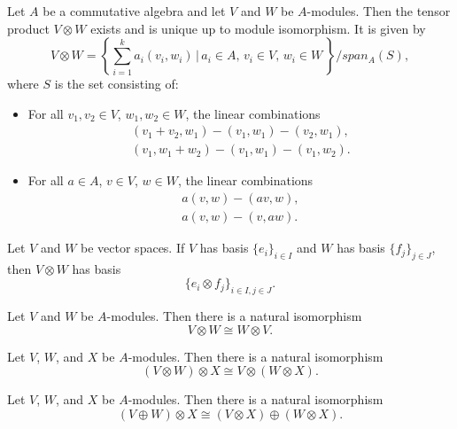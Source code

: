 \documentclass{ximera}
\begin{document}
\begin{theorem}
Let $A$ be a commutative algebra and let $V$ and $W$ be $A$-modules. Then the tensor product $V \otimes  W$ exists and is unique up to module isomorphism. It is given by 
\[   V \otimes  W =    \left\{ \sum_{i = 1}^k  a_i (v_i, w_i) \,\Big\vert \, a_i \in A, \, v_i \in V, \, w_i \in W \,  \right\} / span_A(S) ,    \]
where $S$ is the set consisting of:
\begin{itemize}
    \item  For all $v_1, v_2 \in V$, $w_1, w_2 \in W$, the linear combinations 
    \begin{gather*}
       (v_1 + v_2, w_1) - (v_1, w_1)- (v_2, w_1), \\
        (v_1, w_1 + w_2)  -  (v_1, w_1)  - (v_1, w_2) .
    \end{gather*}
    \item  For all $a \in A$, $v \in V$, $w \in W$, the linear combinations
    \begin{gather*}
       a (v,w) -  (av, w), \\
       a(v,w)- (v, aw).
    \end{gather*}
\end{itemize}
\end{theorem}



\begin{proposition}
Let $V$ and $W$ be vector spaces.  If $V$ has basis $\{ e_i \} _{i \in I}$ and $W$ has basis $\{ f_j \} _{j \in J}$, then $V \otimes W$ has basis 
\[   \{ e_i \otimes f_j \} _{i \in I , j \in J}  .   \]
\end{proposition}

\begin{proposition}[Commutativity] Let $V$ and  $W$  be $A$-modules. Then there is a natural isomorphism
\[  V \otimes  W  \cong W \otimes  V .  \]
\end{proposition}

\begin{proposition}[Associativity] Let $V$, $W$, and $X$ be $A$-modules. Then there is a natural isomorphism
\[ (V \otimes  W) \otimes  X \cong V \otimes  (W \otimes  X ) .  \]
\end{proposition}


\begin{proposition}[Distributivity] Let $V$, $W$, and $X$ be $A$-modules. Then there is a natural isomorphism
\[ (V \oplus  W) \otimes  X \cong  (V \otimes  X )\oplus ( W \otimes  X) .  \]
\end{proposition}
\end{document}
